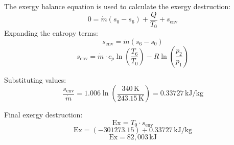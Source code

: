 The exergy balance equation is used to calculate the exergy destruction:  
\[
0 = \dot{m} \left( s_0 - s_6 \right) + \frac{Q}{T_0} + s_{\text{env}}
\]  
Expanding the entropy terms:  
\[
s_{\text{env}} = \dot{m} \left( s_6 - s_0 \right)
\]  
\[
s_{\text{env}} = \dot{m} \cdot c_p \ln \left( \frac{T_6}{T_0} \right) - R \ln \left( \frac{p_2}{p_1} \right)
\]  

Substituting values:  
\[
\frac{s_{\text{env}}}{\dot{m}} = 1.006 \ln \left( \frac{340 \, \text{K}}{243.15 \, \text{K}} \right) = 0.33727 \, \text{kJ/kg}
\]  

Final exergy destruction:  
\[
\text{Ex} = T_0 \cdot s_{\text{env}}
\]  
\[
\text{Ex} = \left( -301273.15 \right) + 0.33727 \, \text{kJ/kg}
\]  
\[
\text{Ex} = 82,003 \, \text{kJ}
\]